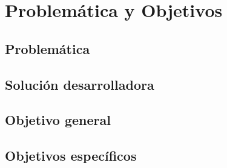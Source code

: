 \chapter{Problemática y Objetivos} \label{chapter:I}
\section{Problem\'{a}tica}
\section{Soluci\'{o}n desarrolladora}
\section{Objetivo general}
\section{Objetivos espec\'{i}ficos}


	
